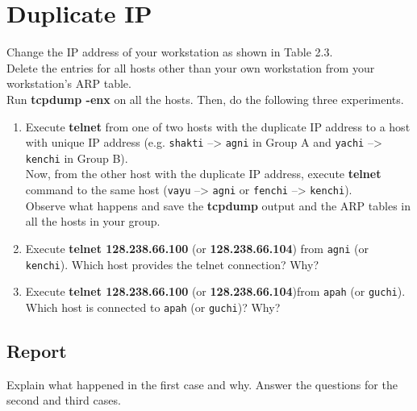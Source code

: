 \documentclass[10pt,a4paper]{article}
\numberwithin{equation}{section}
\numberwithin{figure}{section}
\numberwithin{table}{section}
\begin{document}
\section{Duplicate IP}
    Change the IP address of your workstation as shown in Table 2.3. \\
    Delete the entries for all hosts other than your own workstation from your workstation’s ARP table. \\
    Run \textbf{tcpdump -enx} on all the hosts.
    Then, do the following three experiments. \\
    \begin{enumerate}
        \item Execute \textbf{telnet} from one of two hosts with the duplicate IP address to a host with unique IP address (e.g. \texttt{shakti} –> \texttt{agni} in Group A and \texttt{yachi} –> \texttt{kenchi} in Group B). \\
        Now, from the other host with the duplicate IP address, execute \textbf{telnet} command to the same host (\texttt{vayu} –> \texttt{agni} or \texttt{fenchi} –> \texttt{kenchi}). \\
        Observe what happens and save the \textbf{tcpdump} output and the ARP tables in all the hosts in your group.
        \item Execute \textbf{telnet 128.238.66.100} (or \textbf{128.238.66.104}) from \texttt{agni} (or \texttt{kenchi}).
        Which host provides the telnet connection?
        Why?
        \item Execute \textbf{telnet 128.238.66.100} (or \textbf{128.238.66.104})from \texttt{apah} (or \texttt{guchi}). Which host is connected to \texttt{apah} (or \texttt{guchi})? Why?
    \end{enumerate}
    \subsection*{Report}
    Explain what happened in the first case and why.
    Answer the questions for the second and third cases.
\end{document}
